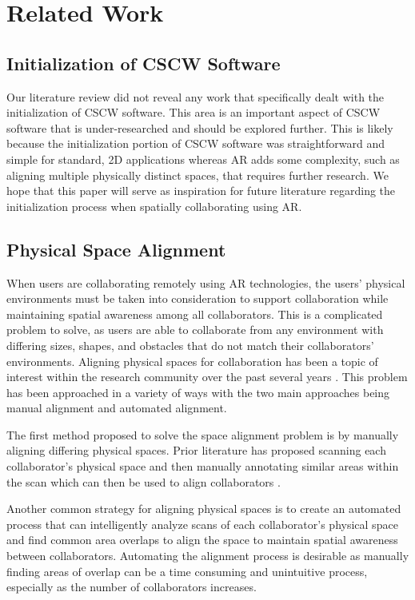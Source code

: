 \section{Related Work}
\subsection{Initialization of CSCW Software}
Our literature review did not reveal any work that specifically dealt with the initialization of CSCW software. This area is an important aspect of CSCW software that is under-researched and should be explored further. This is likely because the initialization portion of CSCW software was straightforward and simple for standard, 2D applications whereas AR adds some complexity, such as aligning multiple physically distinct spaces, that requires further research. We hope that this paper will serve as inspiration for future literature regarding the initialization process when spatially collaborating using AR.  

\subsection{Physical Space Alignment}
When users are collaborating remotely using AR technologies, the users' physical environments must be taken into consideration to support collaboration while maintaining spatial awareness among all collaborators. This is a complicated problem to solve, as users are able to collaborate from any environment with differing sizes, shapes, and obstacles that do not match their collaborators' environments. Aligning physical spaces for collaboration has been a topic of interest within the research community over the past several years \cite{ens_revisiting_2019, marques_remote_2022, marques_critical_2022}. This problem has been approached in a variety of ways with the two main approaches being manual alignment and automated alignment. 

The first method proposed to solve the space alignment problem is by manually aligning differing physical spaces. Prior literature has proposed scanning each collaborator's physical space and then manually annotating similar areas within the scan which can then be used to align collaborators \cite{pejsa_room2room_2016, congdon_merging_2018}.

Another common strategy for aligning physical spaces is to create an automated process that can intelligently analyze scans of each collaborator's physical space and find common area overlaps to align the space to maintain spatial awareness between collaborators. Automating the alignment process is desirable as manually finding areas of overlap can be a time consuming and unintuitive process, especially as the number of collaborators increases. 

